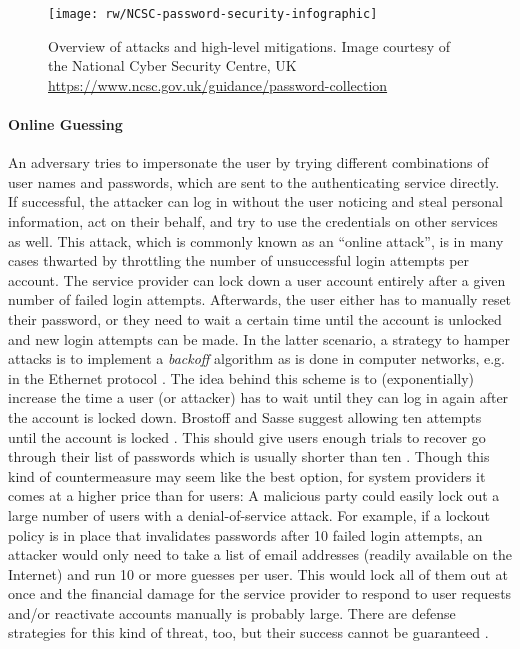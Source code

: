\begin{figure}[h!]
	\centering
	\texttt{[image: rw/NCSC-password-security-infographic]}
	\caption{
		\label{fig:rw:attacks_infographic}
		Overview of attacks and high-level mitigations. Image courtesy of the National Cyber Security Centre, UK \protect\url{https://www.ncsc.gov.uk/guidance/password-collection} \protect{}
	}
\end{figure}


\paragraph{Online Guessing} 
An adversary tries to impersonate the user by trying different combinations of user names and passwords, which are sent to the authenticating service directly. If successful, the attacker can log in without the user noticing and steal personal information, act on their behalf, and try to use the credentials on other services as well. 
	This attack, which is commonly known as an ``online attack'', is in many cases thwarted by throttling the number of unsuccessful login attempts per account. The service provider can lock down a user account entirely after a given number of failed login attempts. Afterwards, the user either has to manually reset their password, or they need to wait a certain time until the account is unlocked and new login attempts can be made. In the latter scenario, a strategy to hamper attacks is to implement a \textit{backoff} algorithm as is done in computer networks, e.g. in the Ethernet protocol \cite[p. 285]{Tanenbaum2011ComputerNetworks}. The idea behind this scheme is to (exponentially) increase the time a user (or attacker) has to wait until they can log in again after the account is locked down. Brostoff and Sasse suggest allowing ten attempts until the account is locked \cite{Brostoff2003TenStrikes}. This should give users enough trials to recover go through their list of passwords which is usually shorter than ten \cite{Florencio2007LargeScaleStudyPasswordHabits}. Though this kind of countermeasure may seem like the best option, for system providers it comes at a higher price than for users: A malicious party could easily lock out a large number of users with a denial-of-service attack. For example, if a lockout policy is in place that invalidates passwords after 10 failed login attempts, an attacker would only need to take a list of email addresses (readily available on the Internet) and run 10 or more guesses per user. This would lock all of them out at once and the financial damage for the service provider to respond to user requests and/or reactivate accounts manually is probably large. There are defense strategies for this kind of threat, too, but their success cannot be guaranteed \cite{Florencio2010WhereDoPoliciesComeFrom}.
	
